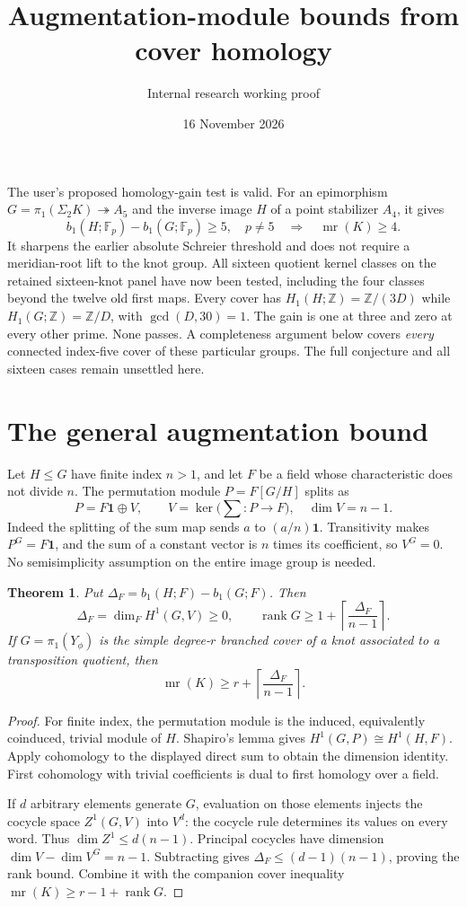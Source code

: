 \documentclass[11pt]{article}
\title{Augmentation-module bounds from cover homology}
\author{Internal research working proof}
\date{16 November 2026}
\newtheorem{theorem}{Theorem}
\newcommand{\mr}{\operatorname{mr}}
\newcommand{\rk}{\operatorname{rank}}
\newcommand{\F}{\mathbb F}
\newcommand{\Z}{\mathbb Z}
\begin{document}
\maketitle

The user's proposed homology-gain test is valid. For an epimorphism
$G=\pi_1(\Sigma_2K)\twoheadrightarrow A_5$ and the inverse image
$H$ of a point stabilizer $A_4$, it gives
\[
 b_1(H;\F_p)-b_1(G;\F_p)\ge5,\quad p\ne5
 \quad\Longrightarrow\quad \mr(K)\ge4.
\]
It sharpens the earlier absolute Schreier threshold and does not
require a meridian-root lift to the knot group. All sixteen quotient
kernel classes on the retained sixteen-knot panel have now been
tested, including the four classes beyond the twelve old first maps.
Every cover has $H_1(H;\Z)=\Z/(3D)$ while $H_1(G;\Z)=\Z/D$,
with $\gcd(D,30)=1$. The gain is one at three and zero at every
other prime. None passes. A completeness argument below covers
\emph{every} connected index-five cover of these particular groups.
The full conjecture and all sixteen cases remain unsettled here.

\section{The general augmentation bound}

Let $H\le G$ have finite index $n>1$, and let $F$ be a field whose
characteristic does not divide $n$. The permutation module
$P=F[G/H]$ splits as
\[
 P=F\mathbf{1}\oplus V,\qquad
 V=\ker\bigl(\textstyle\sum:P\to F\bigr),\quad \dim V=n-1.
\]
Indeed the splitting of the sum map sends $a$ to $(a/n)\mathbf{1}$.
Transitivity makes $P^G=F\mathbf{1}$, and the sum of a constant
vector is $n$ times its coefficient, so $V^G=0$. No semisimplicity
assumption on the entire image group is needed.

\begin{theorem}\label{thm:gain}
Put $\Delta_F=b_1(H;F)-b_1(G;F)$. Then
\[
 \Delta_F=\dim_F H^1(G,V)\ge0,\qquad
 \rk G\ge1+\left\lceil\frac{\Delta_F}{n-1}\right\rceil.
\]
If $G=\pi_1(Y_\phi)$ is the simple degree-$r$ branched cover of a
knot associated to a transposition quotient, then
\[
 \mr(K)\ge r+\left\lceil\frac{\Delta_F}{n-1}\right\rceil.
\]
\end{theorem}
\begin{proof}
For finite index, the permutation module is the induced, equivalently
coinduced, trivial module of $H$. Shapiro's lemma gives
$H^1(G,P)\cong H^1(H,F)$. Apply cohomology to the displayed direct
sum to obtain the dimension identity. First cohomology with trivial
coefficients is dual to first homology over a field.

If $d$ arbitrary elements generate $G$, evaluation on those elements
injects the cocycle space $Z^1(G,V)$ into $V^d$: the cocycle rule
determines its values on every word. Thus $\dim Z^1\le d(n-1)$.
Principal cocycles have dimension $\dim V-\dim V^G=n-1$.
Subtracting gives $\Delta_F\le(d-1)(n-1)$, proving the rank bound.
Combine it with the companion cover inequality
$\mr(K)\ge r-1+\rk G$.
\end{proof}
\end{document}
